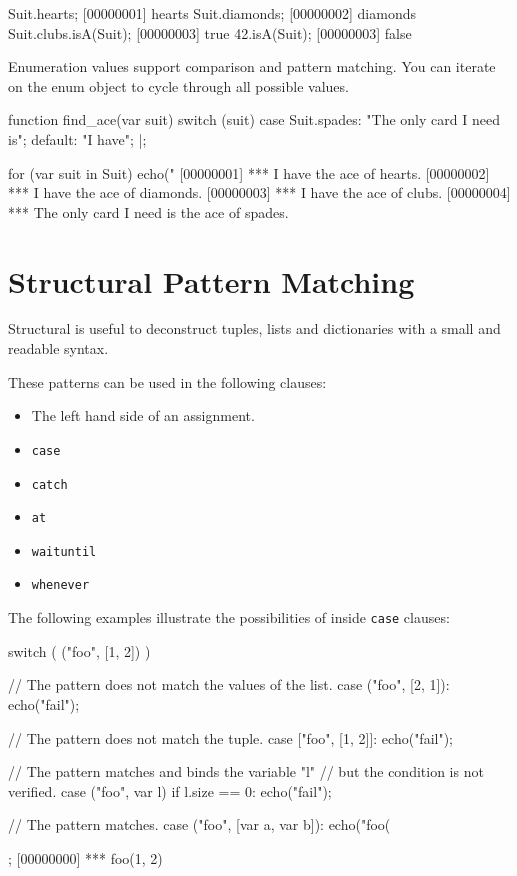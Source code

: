 \begin{urbiscript}
Suit.hearts;
[00000001] hearts
Suit.diamonds;
[00000002] diamonds
Suit.clubs.isA(Suit);
[00000003] true
42.isA(Suit);
[00000003] false
\end{urbiscript}

Enumeration values support comparison and pattern matching. You can iterate
on the enum object to cycle through all possible values.

\begin{urbiscript}
function find_ace(var suit)
{
  switch (suit)
  {
    case Suit.spades: "The only card I need is";
    default:          "I have";
  }
}|;

for (var suit in Suit)
  echo("%
[00000001] *** I have the ace of hearts.
[00000002] *** I have the ace of diamonds.
[00000003] *** I have the ace of clubs.
[00000004] *** The only card I need is the ace of spades.
\end{urbiscript}

\section{Structural Pattern Matching}
\label{sec:lang:pattern}

Structural  is useful to deconstruct tuples, lists and
dictionaries with a small and readable syntax.

These patterns can be used in the following clauses:
\begin{itemize}
\item The left hand side of an assignment.
\item \lstinline{case}
\item \lstinline{catch}
\item \lstinline{at}
\item \lstinline{waituntil}
\item \lstinline{whenever}
\end{itemize}

The following examples illustrate the possibilities of  inside \lstinline{case} clauses:

\begin{urbiscript}
switch ( ("foo", [1, 2]) )
{
  // The pattern does not match the values of the list.
  case ("foo", [2, 1]):
    echo("fail");

  // The pattern does not match the tuple.
  case ["foo", [1, 2]]:
    echo("fail");

  // The pattern matches and binds the variable "l"
  // but the condition is not verified.
  case ("foo", var l) if l.size == 0:
    echo("fail");

  // The pattern matches.
  case ("foo", [var a, var b]):
    echo("foo(%
};
[00000000] *** foo(1, 2)
\end{urbiscript}

